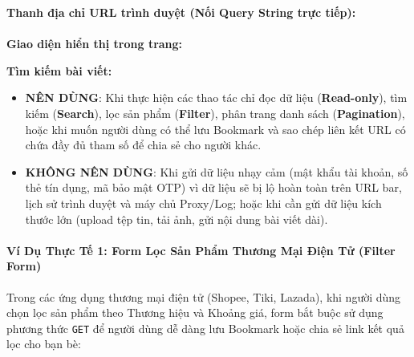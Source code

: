 \documentclass[11pt,oneside]{book}
\newcommand{\codeinline}[1]{\textcolor{accentOrange}{\texttt{#1}}}
\newcommand{\term}[1]{\textbf{\textcolor{primaryBlue}{#1}}}
\begin{document}
\begin{browserWindow}
\sffamily\small
\textbf{Thanh địa chỉ URL trình duyệt (Nối Query String trực tiếp):} \\[3pt]
 \\[8pt]
\textbf{Giao diện hiển thị trong trang:} \\[4pt]
\begin{tcolorbox}[colback=white, colframe=accentOrange!20, arc=4pt, boxrule=0.6pt, left=8pt, right=8pt, top=8pt, bottom=8pt]
  \textbf{Tìm kiếm bài viết:} \\[2pt]
  \tcbox[on line, arc=3pt, colback=codeBg, colframe=codeBorder, boxsep=2pt, left=6pt, right=40pt]{\textcolor{darkText}{HTML5 Masterclass}} \quad
\end{tcolorbox}
\end{browserWindow}

\begin{tipBox}
\begin{itemize}[leftmargin=1.5em, itemsep=3pt, parsep=0pt]
    \item \textbf{NÊN DÙNG}: Khi thực hiện các thao tác chỉ đọc dữ liệu (\term{Read-only}), tìm kiếm (\term{Search}), lọc sản phẩm (\term{Filter}), phân trang danh sách (\term{Pagination}), hoặc khi muốn người dùng có thể lưu Bookmark và sao chép liên kết URL có chứa đầy đủ tham số để chia sẻ cho người khác.
    \item \textbf{KHÔNG NÊN DÙNG}: Khi gửi dữ liệu nhạy cảm (mật khẩu tài khoản, số thẻ tín dụng, mã bảo mật OTP) vì dữ liệu sẽ bị lộ hoàn toàn trên URL bar, lịch sử trình duyệt và máy chủ Proxy/Log; hoặc khi cần gửi dữ liệu kích thước lớn (upload tệp tin, tải ảnh, gửi nội dung bài viết dài).
\end{itemize}
\end{tipBox}

\paragraph{Ví Dụ Thực Tế 1: Form Lọc Sản Phẩm Thương Mại Điện Tử (Filter Form)}
Trong các ứng dụng thương mại điện tử (Shopee, Tiki, Lazada), khi người dùng chọn lọc sản phẩm theo Thương hiệu và Khoảng giá, form bắt buộc sử dụng phương thức \codeinline{GET} để người dùng dễ dàng lưu Bookmark hoặc chia sẻ link kết quả lọc cho bạn bè:
\end{document}
